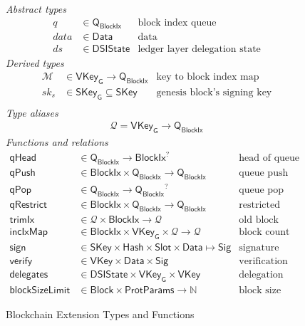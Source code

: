 \documentclass[11pt,a4paper]{article}
\newcommand{\var}[1]{\mathit{#1}}
\newcommand{\fun}[1]{\mathsf{#1}}
\newcommand{\type}[1]{\mathsf{#1}}
\newcommand{\Hash}{\type{Hash}}  %
\newcommand{\Slot}{\type{Slot}}
\newcommand{\BlockIx}{\type{BlockIx}}
\newcommand{\Block}{\type{Block}}
\newcommand{\Queue}{\type{Q}}
\newcommand{\SKey}{\type{SKey}}
\newcommand{\SKeyGen}{\type{SKey_G}}
\newcommand{\VKey}{\type{VKey}}
\newcommand{\VKeyGen}{\type{VKey_G}}
\newcommand{\Sig}{\type{Sig}}
\newcommand{\Data}{\type{Data}}
\newcommand{\DelegState}{\type{DSIState}}
\newcommand{\ProtParams}{\type{ProtParams}} %
\newcommand{\signname}{sign}
\newcommand{\verifyname}{verify}
\newcommand{\delegationname}{delegates} %
\newcommand{\signmapname}{\mathcal{M}}
\newcommand{\trimixname}{trimIx}
\newcommand{\incixmapname}{incIxMap}
\newcommand{\blocksizelimitname}{blockSizeLimit}
\newcommand{\qrestrname}{qRestrict}
\newcommand{\qpopname}{qPop}
\newcommand{\qheadname}{qHead}
\newcommand{\qpushname}{qPush}
\newcommand{\totalf}{\to}
\newcommand{\partialf}{\mapsto}
\newcommand{\mapqueue}{\mathcal{Q}}
\begin{document}
\begin{figure}
  \emph{Abstract types}
  \begin{align*}
    q  & \in \Queue_\BlockIx  & \text{block index queue}\\
  \var{data} & \in \Data    & \text{data}\\
    \var{ds} & \in \DelegState & \text{ledger layer delegation state}
  \end{align*}
  \emph{Derived types}
  \begin{align*}
    \signmapname & \in \VKeyGen \totalf \Queue_\BlockIx & \text{key to block index map}\\
    \var{sk_s} & \in \SKeyGen \subseteq \SKey & \text{genesis block's signing key}\\
  \end{align*}
  \emph{Type aliases}
  \begin{align*}
    \mapqueue = \VKeyGen \totalf \Queue_\BlockIx
  \end{align*}
  \emph{Functions and relations}
  \begin{align*}
    \fun{\qheadname} & \in \Queue_\BlockIx \totalf \BlockIx^? & \text{head of queue function} \\
    \fun{\qpushname} & \in \BlockIx \times \Queue_\BlockIx \totalf \Queue_\BlockIx
      & \text{queue push function} \\
    \fun{\qpopname} & \in \Queue_\BlockIx \totalf {\Queue_\BlockIx}^?
      & \text{queue pop function} \\
    \fun{\qrestrname} & \in \BlockIx \times \Queue_\BlockIx \totalf \Queue_\BlockIx
      & \text{restricted queue pop function} \\
    \fun{\trimixname} & \in \mapqueue \times \BlockIx \totalf \mapqueue
      & \text{old block removal function} \\
    \fun{\incixmapname} & \in \BlockIx \times \VKeyGen \times \mapqueue \totalf \mapqueue
      & \text{block count increment function}\\
    \fun{\signname} & \in \SKey \times \Hash \times \Slot \times \Data \partialf \Sig
      & \text{signature function}\\
    \fun{\verifyname} & \in \VKey \times \Data \times \Sig
      & \text{verification relation}\\
    \fun{\delegationname} & \in \DelegState \times \VKeyGen \times \VKey
      & \text{delegation relation}\\
    \fun{\blocksizelimitname} & \in \Block \times \ProtParams \totalf \mathbb{N}
      & \text{block size limit in bytes function}
  \end{align*}
  \caption{Blockchain Extension Types and Functions}
  \label{fig:block-ext-types-funs}
\end{figure}
\end{document}
